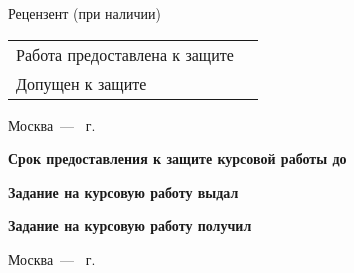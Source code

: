 \documentclass[14pt, a4paper, titlepage]{extarticle}
\begin{document}
\begin{titlepage}
	Рецензент (при наличии)  \hfill{} \bigskip\par
	\begin{tabular}{@{}ll}
		Работа предоставлена к защите & \blankDate{}{} \bigskip\\
		Допущен к защите & \blankDate{}{}
	\end{tabular}
	\begin{center}
		\vfill Москва~--- \the\year{}~г.
	\end{center}
	\newpage
	\textbf{Срок предоставления к защите курсовой работы до} \hfill\blankDate{}{} \par
	\textbf{Задание на курсовую работу выдал}  \hfill{} \par
	\hfill\blankDate{}{} \par
	\textbf{Задание на курсовую работу получил}  \hfill{} \par\bigskip
	\begin{center}
		Москва~--- \the\year{}~г.
	\end{center}
\end{titlepage}
\addtocounter{page}{2}
\end{document}
